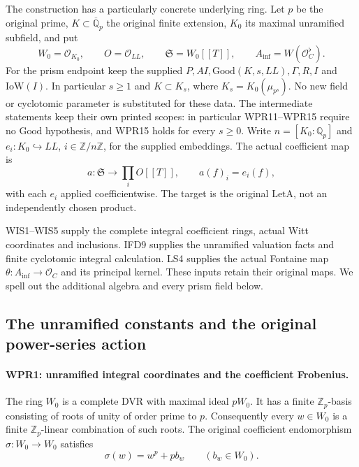 \documentclass[11pt,a4paper]{article}
\numberwithin{equation}{section}
\theoremstyle{remark}\newtheorem{remark}[theorem]{Remark}
\begin{document}
The construction has a particularly concrete underlying ring. Let
$p$ be the original prime, $K\subset\overline{\mathbb Q}_p$ the
original finite extension, $K_0$ its maximal unramified subfield,
and put
\[
 W_0=\mathcal O_{K_0},\qquad O=\mathcal O_{LL},\qquad
 \mathfrak S=W_0[[T]],\qquad A_{\mathrm{inf}}=W(\mathcal O_C^\flat).
 \tag{WPR.1}
\]
For the prism endpoint keep the supplied
$P,AI,\mathrm{Good}(K,s,LL),\Gamma,R,I$ and
$\mathrm{IoW}(I)$. In particular $s\geq1$ and $K\subset K_s$,
where $K_s=K_0(\mu_{p^s})$. No new field or cyclotomic parameter
is substituted for these data. The intermediate statements keep
their own printed scopes: in particular WPR11--WPR15 require
no $\mathrm{Good}$ hypothesis, and WPR15 holds for every $s\geq0$. Write $n=[K_0:\mathbb Q_p]$ and
$e_i:K_0\hookrightarrow LL$, $i\in\mathbb Z/n\mathbb Z$, for
the supplied embeddings. The actual coefficient map is
\[
 a:\mathfrak S\longrightarrow\prod_i O[[T]],\qquad
 a(f)_i=e_i(f),
 \tag{WPR.2}
\]
with each $e_i$ applied coefficientwise. The target is the original
$\mathrm{LetA}$, not an independently chosen product.

WIS1--WIS5 supply the complete integral coefficient rings, actual
Witt coordinates and inclusions. IFD9 supplies the unramified
valuation facts and finite cyclotomic integral calculation. LS4
supplies the actual Fontaine map $\theta:A_{\mathrm{inf}}\to\mathcal O_C$
and its principal kernel. These inputs retain their original maps.
We spell out the additional algebra and every prism field below.

\subsection{The unramified constants and the original power-series action}

\paragraph{WPR1: unramified integral coordinates and the coefficient Frobenius.}
\label{claim:WPR1}
The ring $W_0$ is a complete DVR with maximal ideal $pW_0$.
It has a finite $\mathbb Z_p$-basis consisting of roots of unity
of order prime to $p$. Consequently every $w\in W_0$ is a
finite $\mathbb Z_p$-linear combination of such roots. The
original coefficient endomorphism $\sigma:W_0\to W_0$ satisfies
\[
                  \sigma(w)=w^p+p b_w\qquad(b_w\in W_0).
 \tag{WPR.3}
\]
\end{document}
